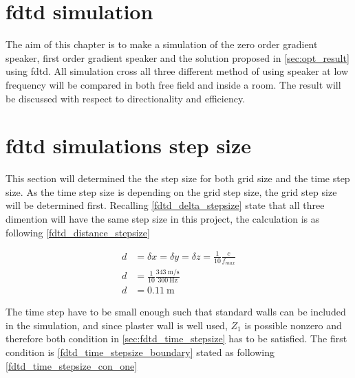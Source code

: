 \section{\gls{fdtd} simulation} \label{sec:fdtd_simulation}
The aim of this chapter is to make a simulation of the zero order gradient speaker, first order gradient speaker and the solution proposed in \autoref{sec:opt_result} using \gls{fdtd}. All simulation cross all three different method of using speaker at low frequency will be compared in both free field and inside a room. The result will be discussed with respect to directionality and efficiency. 

\section{\gls{fdtd} simulations step size}
This section will determined the the step size for both grid size and the time step size. As the time step size is depending on the grid step size, the grid step size will be determined first. Recalling \autoref{fdtd_delta_stepsize} state that all three dimention will have the same step size in this project, the calculation is as following \autoref{fdtd_distance_stepsize} 

\begin{subequations}\label{fdtd_distance_stepsize}
\begin{alignat}{2}
d &= \delta x = \delta y = \delta z= \frac{1}{10} \frac{c}{f_{max}} \label{fdtd_distance_stepsize_1}\\
d &= \frac{1}{10} \frac{\SI{343}{\meter\per\second}}{\SI{300}{\hertz}} \label{fdtd_distance_stepsize_2}\\
d &= \SI{0.11}{\meter} \label{fdtd_distance_stepsize_3}
\end{alignat}
\end{subequations}

    \startexplain
    \stopexplain
    
The time step have to be small enough such that standard walls can be included in the simulation, and since plaster wall is well used, $Z_{1}$ is possible nonzero and therefore both condition in \autoref{sec:fdtd_time_stepsize} has to be satisfied. The first condition is \autoref{fdtd_time_stepsize_boundary} stated as following \autoref{fdtd_time_stepsize_con_one}
    

